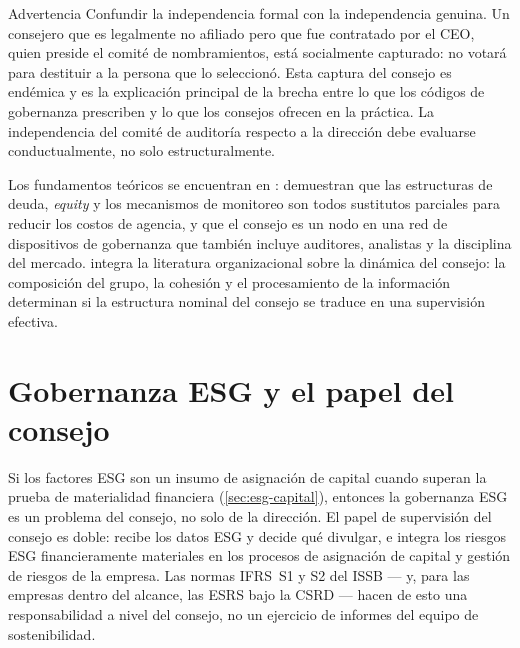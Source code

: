 \begin{admonition}{Advertencia}
Confundir la independencia formal con la independencia genuina. Un consejero que es legalmente no afiliado pero que fue contratado por el CEO, quien preside el comité de nombramientos, está socialmente capturado: no votará para destituir a la persona que lo seleccionó. Esta captura del consejo es endémica y es la explicación principal de la brecha entre lo que los códigos de gobernanza prescriben y lo que los consejos ofrecen en la práctica. La independencia del comité de auditoría respecto a la dirección debe evaluarse conductualmente, no solo estructuralmente.
\end{admonition}

Los fundamentos teóricos se encuentran en \textcite{jensen1976agency}: demuestran que las estructuras de deuda, \emph{equity} y los mecanismos de monitoreo son todos sustitutos parciales para reducir los costos de agencia, y que el consejo es un nodo en una red de dispositivos de gobernanza que también incluye auditores, analistas y la disciplina del mercado. \textcite{robbins2022} integra la literatura organizacional sobre la dinámica del consejo: la composición del grupo, la cohesión y el procesamiento de la información determinan si la estructura nominal del consejo se traduce en una supervisión efectiva.

\section{Gobernanza ESG y el papel del consejo}\label{sec:esg-governance}

Si los factores ESG son un insumo de asignación de capital cuando superan la prueba de materialidad financiera (\cref{sec:esg-capital}), entonces la gobernanza ESG es un problema del consejo, no solo de la dirección. El papel de supervisión del consejo es doble: recibe los datos ESG y decide qué divulgar, e integra los riesgos ESG financieramente materiales en los procesos de asignación de capital y gestión de riesgos de la empresa. Las normas IFRS~S1 y S2 del ISSB --- y, para las empresas dentro del alcance, las ESRS bajo la CSRD --- hacen de esto una responsabilidad a nivel del consejo, no un ejercicio de informes del equipo de sostenibilidad.

